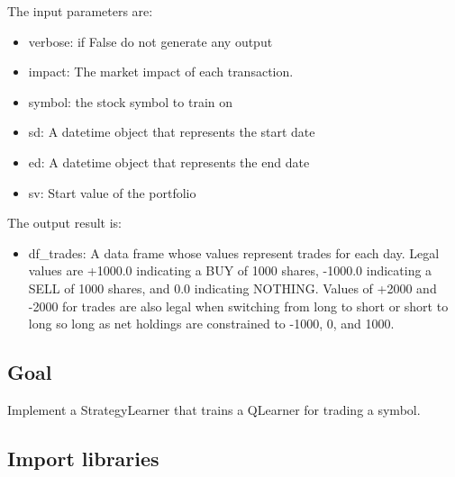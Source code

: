 \documentclass[11pt]{article}
\providecommand{\tightlist}{%
      \setlength{\itemsep}{0pt}\setlength{\parskip}{0pt}}
\begin{document}
The input parameters are:

\begin{itemize}
\tightlist
\item
  verbose: if False do not generate any output
\item
  impact: The market impact of each transaction.
\item
  symbol: the stock symbol to train on
\item
  sd: A datetime object that represents the start date
\item
  ed: A datetime object that represents the end date
\item
  sv: Start value of the portfolio
\end{itemize}

The output result is:

\begin{itemize}
\tightlist
\item
  df\_trades: A data frame whose values represent trades for each day.
  Legal values are +1000.0 indicating a BUY of 1000 shares, -1000.0
  indicating a SELL of 1000 shares, and 0.0 indicating NOTHING. Values
  of +2000 and -2000 for trades are also legal when switching from long
  to short or short to long so long as net holdings are constrained to
  -1000, 0, and 1000.
\end{itemize}

    \subsection{Goal}\label{goal}

Implement a StrategyLearner that trains a QLearner for trading a symbol.

    \subsection{Import libraries}\label{import-libraries}
\end{document}
